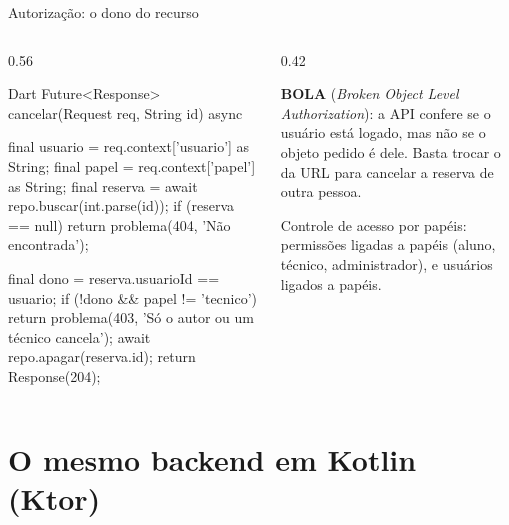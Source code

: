\documentclass[aspectratio=169,10pt]{beamer}
\begin{document}
\begin{frame}[fragile]{Autorização: o dono do recurso}
  \begin{columns}[T]
    \begin{column}{0.56\textwidth}
\begin{codigo}[title=lib/reserva\_service.dart (cancelar)]{Dart}
Future<Response> cancelar(Request req, String id) async {
  final usuario = req.context['usuario'] as String;
  final papel = req.context['papel'] as String;
  final reserva = await repo.buscar(int.parse(id));
  if (reserva == null) return problema(404, 'Não encontrada');

  final dono = reserva.usuarioId == usuario;
  if (!dono && papel != 'tecnico') {
    return problema(403, 'Só o autor ou um técnico cancela');
  }
  await repo.apagar(reserva.id);
  return Response(204);
}
\end{codigo}
    \end{column}
    \begin{column}{0.42\textwidth}
      \begin{erro}
        \textbf{BOLA} (\emph{Broken Object Level Authorization}): a API confere se o usuário está logado, mas não se o objeto pedido é dele. Basta trocar o  da URL para cancelar a reserva de outra pessoa.
      \end{erro}
      \begin{definicao}[RBAC]
        Controle de acesso por papéis: permissões ligadas a papéis (aluno, técnico, administrador), e usuários ligados a papéis.
      \end{definicao}
    \end{column}
  \end{columns}
\end{frame}

\section{O mesmo backend em Kotlin (Ktor)}
\end{document}
